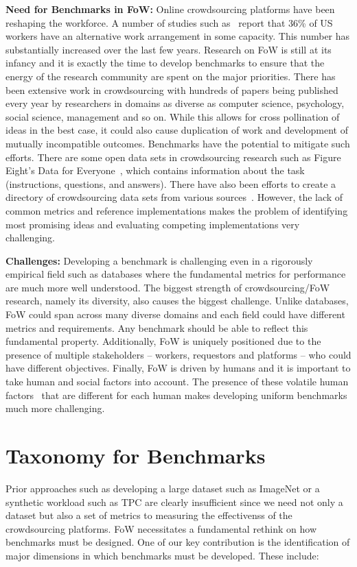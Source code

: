 \textbf{Need for Benchmarks in FoW:}
Online crowdsourcing platforms have been reshaping the workforce.
A number of studies such as~\cite{mcfeely2018workplace} report that
36\% of US workers have an alternative work arrangement in some capacity.
This number has substantially increased over the last few years.
Research on FoW is still at its infancy and it is exactly the time to develop benchmarks
to ensure that the energy of the research community are spent on the major priorities.
There has been extensive work in crowdsourcing
with hundreds of papers being published every year by researchers in
domains as diverse as computer science, psychology, social science, management and so on.
While this allows for cross pollination of ideas in the best case,
it could also cause duplication of work and development of mutually incompatible outcomes.
Benchmarks have the potential to mitigate such efforts.
There are some open data sets in crowdsourcing research such as
Figure Eight's Data for Everyone~\cite{Figure8DataForEveryone}, which contains information about the task (instructions, questions, and answers). There have also been efforts to create a directory of crowdsourcing data sets from various sources~\cite{li2016crowdsourced}.
However, the lack of common metrics and reference implementations makes the problem of identifying
most promising ideas and evaluating competing implementations very challenging.

\textbf{Challenges:}
Developing a benchmark is challenging even in a rigorously empirical field such as databases
where the fundamental metrics for performance are much more well understood.
The biggest strength of crowdsourcing/FoW research, namely its diversity, also causes the biggest challenge.
Unlike databases, FoW could span across many diverse domains and each field could have different metrics and requirements.
Any benchmark should be able to reflect this fundamental property.
Additionally, FoW is uniquely positioned due to the presence of multiple stakeholders
-- workers, requestors and platforms -- who could have different objectives.
Finally, FoW is driven by humans and it is important to take human and social factors into account.
The presence of these volatile human factors~\cite{roy2013crowds}
that are different for each human makes developing uniform benchmarks much more challenging.

\section{Taxonomy for Benchmarks}
Prior approaches such as developing a large dataset such as ImageNet or a synthetic workload such as TPC
are clearly insufficient since we need not only a dataset but also a set of metrics to measuring the effectivenss of the crowdsourcing platforms.
FoW necessitates a fundamental rethink on how benchmarks must be designed.
One of our key contribution is the identification of major dimensions in which benchmarks must be developed.
These include:


